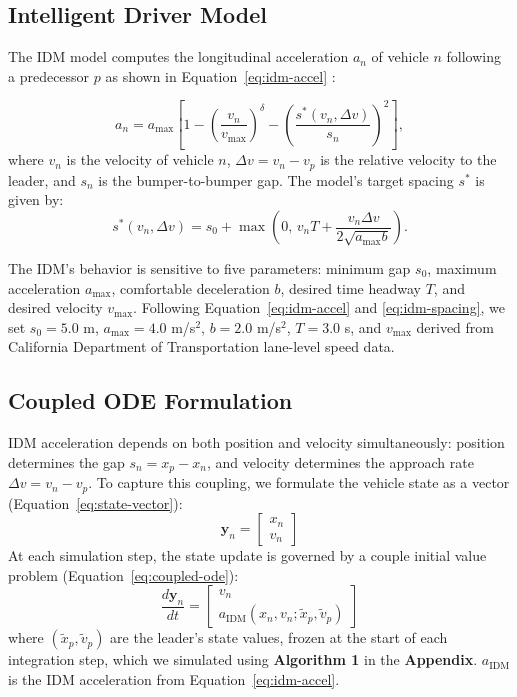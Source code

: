 \documentclass{scspaperproc}
\theoremstyle{scsthe}
\begin{document}
\subsection{Intelligent Driver Model}

The IDM model computes the longitudinal acceleration
$a_n$ of vehicle $n$ following a predecessor $p$ as shown in Equation~\eqref{eq:idm-accel}  \cite{treiber2000congested}:

\begin{equation}
\label{eq:idm-accel}
a_n = a_{\max} \left[
1 - \left( \frac{v_n}{v_{\max}} \right)^\delta
- \left( \frac{s^*(v_n, \Delta v)}{s_n} \right)^2
\right],
\end{equation}
where $v_n$ is the velocity of vehicle $n$, $\Delta v = v_n - v_p$ is the
relative velocity to the leader, and $s_n$ is the bumper-to-bumper gap.
The model's target spacing $s^*$ is given by:
\begin{equation}
\label{eq:idm-spacing}
s^*(v_n, \Delta v) =
s_0 + \max\!\left(0,\, v_n T + \frac{v_n \Delta v}{2\sqrt{a_{\max} b}} \right).
\end{equation}

The IDM's behavior is sensitive to five parameters: minimum gap $s_0$, maximum acceleration $a_{\max}$, comfortable deceleration $b$, desired time headway $T$, and desired velocity $v_{\max}$.
Following Equation~\eqref{eq:idm-accel} and \eqref{eq:idm-spacing}, we set $s_0 = 5.0$ m, $a_{\max} = 4.0$ m/s$^2$, $b = 2.0$ m/s$^2$, $T = 3.0$ s, and $v_{\max}$ derived from California Department of Transportation \cite{caltran_pems} lane-level speed data.

\subsection{Coupled ODE Formulation}
IDM acceleration depends on both position and velocity simultaneously: position determines the gap $s_n = x_p - x_n$, and velocity determines the approach rate $\Delta v = v_n - v_p$. To capture this coupling, we formulate the vehicle state as a vector (Equation~\eqref{eq:state-vector}):
\begin{equation}
\label{eq:state-vector}
\mathbf{y}_n = \begin{bmatrix} x_n \\ v_n \end{bmatrix}
\end{equation}
At each simulation step, the state update is governed by a couple initial value problem (Equation~\eqref{eq:coupled-ode}):
\begin{equation}
\label{eq:coupled-ode}
\frac{d\mathbf{y}_n}{dt} = \begin{bmatrix} v_n \\ a_{\text{IDM}}(x_n, v_n; \tilde{x}_p, \tilde{v}_p) \end{bmatrix}
\end{equation}
where $(\tilde{x}_p, \tilde{v}_p)$ are the leader's state values, frozen at the start of each integration step, which we simulated using \textbf{Algorithm 1} in the 
\textbf{Appendix}. $a_{\text{IDM}}$ is the IDM acceleration from Equation~\eqref{eq:idm-accel}.  
\end{document}
